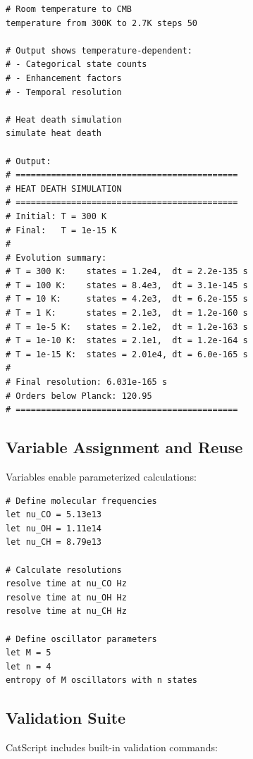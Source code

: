 \documentclass[twocolumn,10pt]{article}
\begin{document}
\begin{lstlisting}[caption={Temperature evolution simulation}]
# Room temperature to CMB
temperature from 300K to 2.7K steps 50

# Output shows temperature-dependent:
# - Categorical state counts
# - Enhancement factors
# - Temporal resolution

# Heat death simulation
simulate heat death

# Output:
# ============================================
# HEAT DEATH SIMULATION
# ============================================
# Initial: T = 300 K
# Final:   T = 1e-15 K
#
# Evolution summary:
# T = 300 K:    states = 1.2e4,  dt = 2.2e-135 s
# T = 100 K:    states = 8.4e3,  dt = 3.1e-145 s
# T = 10 K:     states = 4.2e3,  dt = 6.2e-155 s
# T = 1 K:      states = 2.1e3,  dt = 1.2e-160 s
# T = 1e-5 K:   states = 2.1e2,  dt = 1.2e-163 s
# T = 1e-10 K:  states = 2.1e1,  dt = 1.2e-164 s
# T = 1e-15 K:  states = 2.01e4, dt = 6.0e-165 s
#
# Final resolution: 6.031e-165 s
# Orders below Planck: 120.95
# ============================================
\end{lstlisting}

\subsection{Variable Assignment and Reuse}

Variables enable parameterized calculations:

\begin{lstlisting}[caption={Variable usage}]
# Define molecular frequencies
let nu_CO = 5.13e13
let nu_OH = 1.11e14
let nu_CH = 8.79e13

# Calculate resolutions
resolve time at nu_CO Hz
resolve time at nu_OH Hz
resolve time at nu_CH Hz

# Define oscillator parameters
let M = 5
let n = 4
entropy of M oscillators with n states
\end{lstlisting}

\subsection{Validation Suite}

CatScript includes built-in validation commands:
\end{document}
